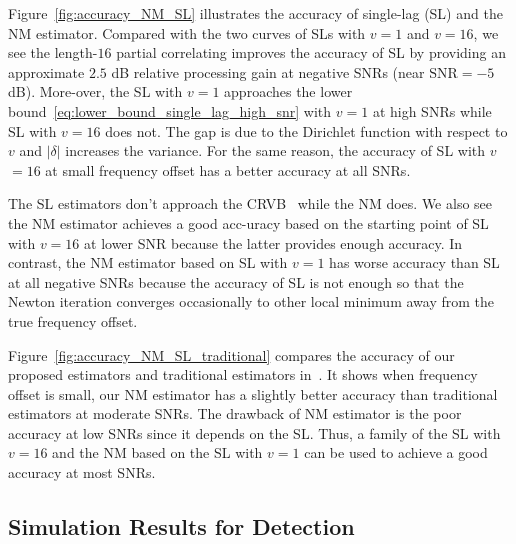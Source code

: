 Figure~\ref{fig:accuracy_NM_SL} illustrates the accuracy of single-lag (SL) and the NM estimator.
Compared with the two curves of SLs with $v{=}1$ and $v{=}16$, 
we see the length-$16$ partial correlating
improves the accuracy of SL by providing an approximate $2.5$ dB relative processing gain at negative SNRs (near $\text{SNR}=-5$ dB).
More-over, the SL with $v{=}1$ approaches the lower bound~\eqref{eq:lower_bound_single_lag_high_snr} with $v=1$ at high SNRs
while SL with $v{=}16$ does not. 
The gap is due to the Dirichlet function 
with respect to $v$ and $|\delta|$
increases the variance. 
For the same reason, the accuracy of SL with $v$
${=}16$ at small frequency offset has a better accuracy at all SNRs.

The SL estimators don't approach the CRVB~\cite{Gini_98} while the NM does. 
We also see the NM estimator achieves a good acc-uracy 
based on the starting point of SL with $v=16$ at lower SNR
because the latter provides enough accuracy. 
In contrast, the NM estimator based on SL with $v=1$ has worse accuracy than SL 
at all negative SNRs because the accuracy of SL is not enough so that the Newton iteration converges occasionally to 
other local minimum away from the true frequency offset.

Figure~\ref{fig:accuracy_NM_SL_traditional} compares the accuracy of our proposed estimators
and traditional estimators in~\cite{kay_89,Fitz_94,Luise_Reggiannini_95}. It shows when 
frequency offset is small, our NM estimator has a slightly better accuracy than traditional estimators at moderate SNRs.
The drawback of NM estimator is the poor accuracy at low SNRs since it depends on the 
SL. Thus, a family of the SL with $v=16$ and the NM based on the SL with $v=1$ can be used 
to achieve a good accuracy at most SNRs.

\subsection{Simulation Results for Detection}



